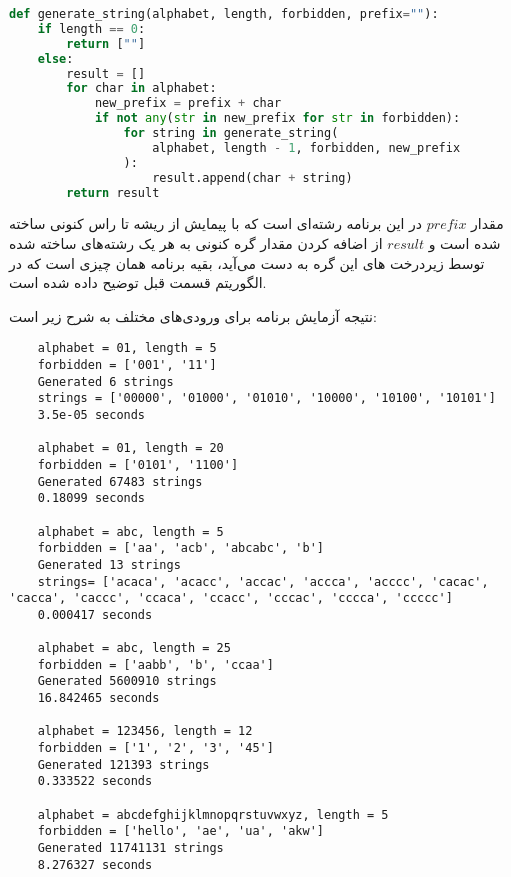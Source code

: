 \documentclass[]{article}
\begin{document}
\begin{latin}
\begin{lstlisting}[language=python]
def generate_string(alphabet, length, forbidden, prefix=""):
    if length == 0:
        return [""]
    else:
        result = []
        for char in alphabet:
            new_prefix = prefix + char
            if not any(str in new_prefix for str in forbidden):
                for string in generate_string(
                    alphabet, length - 1, forbidden, new_prefix
                ):
                    result.append(char + string)
        return result
\end{lstlisting}
\end{latin}
مقدار $prefix$ در این برنامه
رشته‌ای است که با پیمایش از ریشه تا راس کنونی ساخته شده است و
$result$
از اضافه کردن مقدار گره کنونی به هر یک رشته‌های ساخته شده توسط زیردرخت های این گره به دست می‌آید،
بقیه برنامه همان چیزی است که در الگوریتم قسمت قبل توضیح داده شده است.

\vspace{0.2cm}
نتیجه آزمایش برنامه برای ورودی‌های مختلف به شرح زیر است:
\begin{latin}
\begin{lstlisting}
    alphabet = 01, length = 5
    forbidden = ['001', '11']
    Generated 6 strings
    strings = ['00000', '01000', '01010', '10000', '10100', '10101']
    3.5e-05 seconds
    
    alphabet = 01, length = 20
    forbidden = ['0101', '1100']
    Generated 67483 strings
    0.18099 seconds
    
    alphabet = abc, length = 5
    forbidden = ['aa', 'acb', 'abcabc', 'b']
    Generated 13 strings
    strings= ['acaca', 'acacc', 'accac', 'accca', 'acccc', 'cacac', 'cacca', 'caccc', 'ccaca', 'ccacc', 'cccac', 'cccca', 'ccccc']
    0.000417 seconds
    
    alphabet = abc, length = 25
    forbidden = ['aabb', 'b', 'ccaa']
    Generated 5600910 strings
    16.842465 seconds
    
    alphabet = 123456, length = 12
    forbidden = ['1', '2', '3', '45']
    Generated 121393 strings
    0.333522 seconds
    
    alphabet = abcdefghijklmnopqrstuvwxyz, length = 5
    forbidden = ['hello', 'ae', 'ua', 'akw']
    Generated 11741131 strings
    8.276327 seconds
\end{lstlisting}
\end{latin}
\end{document}
